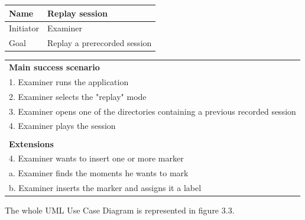 \documentclass[binding=0.6cm,LaM]{sapthesis}
\begin{document}
\begin{enumerate}
\renewcommand{\arraystretch}{1.5}
\begin{center}
\begin{tabular}{| l | l |}
  \hline			
  Name & Replay session \\
  \hline
  Initiator & Examiner \\
  \hline
  Goal & Replay a prerecorded session \\
  \hline  
\end{tabular}

\vspace{.5cm}

\renewcommand{\arraystretch}{1}
\begin{tabular}{ l }
\textbf{Main success scenario} \\
1. Examiner runs the application\\
2. Examiner selects the "replay" mode\\
3. Examiner opens one of the directories containing a previous recorded session \\
4. Examiner plays the session \\

\vspace{0.1cm}\\

\textbf{Extensions} \\
4. Examiner wants to insert one or more marker\\
\quad a. Examiner finds the moments he wants to mark \\
\quad b. Examiner inserts the marker and assigns it a label \\
\end{tabular}

\end{center}


\end{enumerate}

The whole UML Use Case Diagram is represented in figure 3.3. 
\end{document}

